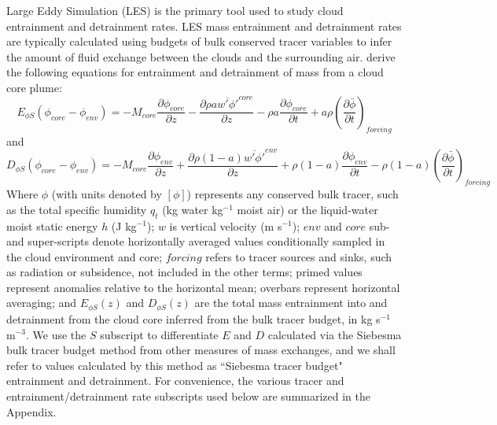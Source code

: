 \documentclass[12pt]{article}
\begin{document}
Large Eddy Simulation (LES) is the primary tool used to study cloud entrainment
and detrainment rates.  LES mass entrainment and detrainment rates are typically
calculated using budgets of bulk conserved tracer variables to infer the amount
of fluid exchange between the clouds and the surrounding air.  
\cite{Siebesma1995} derive the following equations for entrainment and
detrainment of mass from a cloud core plume:
\begin{equation}
  \label{eq:siebesma_entrainment}
    E_{\phi S}(\phi_{core} - \phi_{env}) = - M_{core} \frac{\partial \phi_{core}}{\partial z}
        - \frac{\partial \rho a \overline{w' \phi'}^{core}}{\partial z}
        - \rho a \frac{\partial \phi_{core}}{\partial t}
        + a \rho \left(\frac{\partial \bar{\phi}}{\partial t}\right)_{forcing}
\end{equation}
and
\begin{equation}
  \label{eq:siebesma_detrainment}
    D_{\phi S}(\phi_{core} - \phi_{env}) = - M_{core} \frac{\partial \phi_{env}}{\partial z}
        + \frac{\partial \rho (1 - a) \overline{w' \phi'}^{env}}{\partial z}
        + \rho (1-a) \frac{\partial \phi_{env}}{\partial t}
     - \rho (1-a) \left(\frac{\partial \bar{\phi}}{\partial t}\right)_{forcing}
\end{equation}
Where $\phi$ (with units denoted by $[\phi]$) represents any conserved
bulk tracer, such as the total specific humidity $q_t$ (kg water
kg$^{-1}$ moist air) or the liquid-water moist static energy $h$ (J
kg$^{-1}$); $w$ is vertical velocity (m
s$^{-1}$); $env$ and $core$ sub-and super-scripts denote horizontally
averaged values conditionally sampled in the cloud environment and
core; $forcing$ refers to tracer sources and sinks, such as radiation
or subsidence, not included in the other terms; primed values
represent anomalies relative to the horizontal mean; overbars
represent horizontal averaging; and $E_{\phi S}(z)$ and $D_{\phi
  S}(z)$ are the total mass entrainment into and detrainment from the
cloud core inferred from the bulk tracer budget, in kg s$^{-1}$
m$^{-3}$.  We use the $S$ subscript to differentiate $E$ and $D$
calculated via the Siebesma bulk tracer budget method from other
measures of mass exchanges, and we shall refer to values calculated by
this method as ``Siebesma tracer budget" entrainment and detrainment.
For convenience, the various tracer and entrainment/detrainment rate subscripts 
used below are summarized in the Appendix.
\end{document}
